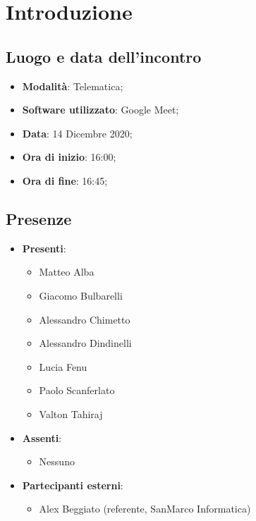\documentclass[]{article}
\begin{document}
	

	\newpage


	\section{Introduzione}
		\subsection{Luogo e data dell'incontro}
		\begin{itemize}
			\item \textbf{Modalità}: Telematica;
			\item \textbf{Software utilizzato}: Google Meet;
			\item \textbf{Data}: 14 Dicembre 2020;
			\item \textbf{Ora di inizio}: 16:00;
			\item \textbf{Ora di fine}: 16:45;
		\end{itemize}

		\subsection{Presenze}
		\begin{itemize}
			\item \textbf{Presenti}:
			\begin{itemize}
				\item Matteo Alba
				\item Giacomo Bulbarelli
				\item Alessandro Chimetto
				\item Alessandro Dindinelli
				\item Lucia Fenu
				\item Paolo Scanferlato
				\item Valton Tahiraj
			\end{itemize}
			\item \textbf{Assenti}:
			\begin{itemize}
				\item Nessuno
			\end{itemize}
			\item \textbf{Partecipanti esterni}:
			\begin{itemize}
			\item Alex Beggiato (referente, SanMarco Informatica)
		\end{itemize}
		\end{itemize}
\end{document}
